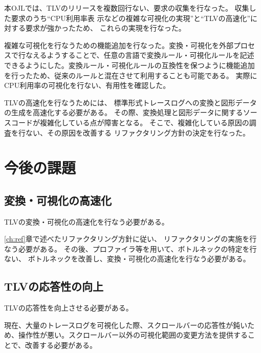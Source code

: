 本OJLでは、TLVのリリースを複数回行ない、要求の収集を行なった。
収集した要求のうち``CPU利用率表
示などの複雑な可視化の実現''と``TLVの高速化''に対する要求が強かったため、
これらの実現を行なった。

複雑な可視化を行なうための機能追加を行なった。変換・可視化を外部プロセ
スで行なえるようすることで、任意の言語で変換ルール・可視化ルールを記述
できるようにした。変換ルール・可視化ルールの互換性を保つように機能追加
を行ったため、従来のルールと混在させて利用することも可能である。
実際にCPU利用率の可視化を行ない、有用性を確認した。

TLVの高速化を行なうためには、
標準形式トレースログへの変換と図形データの生成を高速化する必要がある。
その際、変換処理と図形データに関するソースコードが複雑化している点が障害となる。
そこで、複雑化している原因の調査を行ない、その原因を改善する
リファクタリング方針の決定を行なった。

\section{今後の課題}
\subsection*{変換・可視化の高速化}
TLVの変換・可視化の高速化を行なう必要がある。

\ref{ch:ref}章で述べたリファクタリング方針に従い、
リファクタリングの実施を行なう必要がある。
その後、プロファイラ等を用いて、ボトルネックの特定を行ない、
ボトルネックを改善し、変換・可視化の高速化を行なう必要がある。

\subsection*{TLVの応答性の向上}
TLVの応答性を向上させる必要がある。

現在、大量のトレースログを可視化した際、スクロールバーの応答性が鈍いた
め、操作性が悪い。スクロールバー以外の可視化範囲の変更方法を提供するこ
とで、改善する必要がある。

